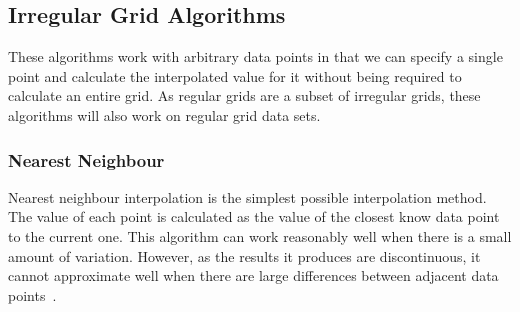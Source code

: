     \subsection{Irregular Grid Algorithms}\label{background_interpolation_methods_irregular_grid}

        These algorithms work with arbitrary data points in that we can specify a single point and calculate the interpolated value for it without being required to calculate an entire grid. As regular grids are a subset of irregular grids, these algorithms will also work on regular grid data sets.

        \subsubsection{Nearest Neighbour}\label{background_interpolation_methods_nearest_neighbour}

            Nearest neighbour interpolation is the simplest possible interpolation method. The value of each point is calculated as the value of the closest know data point to the current one. This algorithm can work reasonably well when there is a small amount of variation. However, as the results it produces are discontinuous, it cannot approximate well when there are large differences between adjacent data points~\cite{imageresamplingcomparison}.


